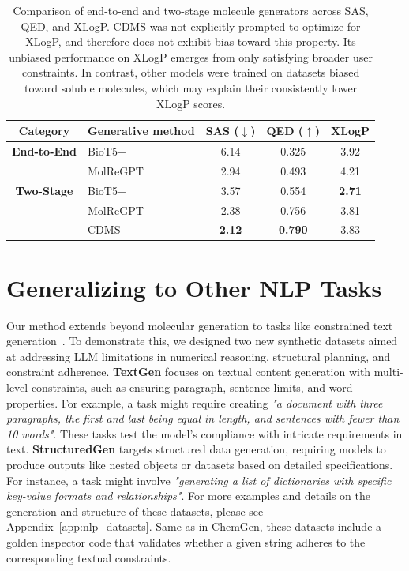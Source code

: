 \documentclass[10pt]{article} %
\begin{document}
\begin{table}
    \centering
    \small
    \begin{tabular}{c|l|c|c|c}
        \toprule
        Category & Generative method & SAS ($\downarrow$) & QED ($\uparrow$) & XLogP \\
        \midrule
        \textbf{End-to-End} & BioT5+     & 6.14 & 0.325 & 3.92 \\
                            & MolReGPT   & 2.94 & 0.493 & 4.21 \\
        \midrule
        \textbf{Two-Stage}  & BioT5+     & 3.57 & 0.554 & \textbf{2.71} \\
                            & MolReGPT   & 2.38 & 0.756 & 3.81  \\
                            & CDMS       & \textbf{2.12} & \textbf{0.790} & 3.83 \\
        \bottomrule
    \end{tabular}
    \caption{\small Comparison of end-to-end and two-stage molecule generators across SAS, QED, and XLogP. CDMS was not explicitly prompted to optimize for XLogP, and therefore does not exhibit bias toward this property. Its unbiased performance on XLogP emerges from only satisfying broader user constraints. In contrast, other models were trained on datasets biased toward soluble molecules, which may explain their consistently lower XLogP scores.}
    \label{tab:two_stage_vs_e2e}
\end{table}
    
\section{Generalizing to Other NLP Tasks}
    Our method extends beyond molecular generation to tasks like constrained text generation~\cite{lin-etal-2020-commongen}. To demonstrate this, we designed two new synthetic datasets aimed at addressing LLM limitations in numerical reasoning, structural planning, and constraint adherence.
    \textbf{TextGen} focuses on textual content generation with multi-level constraints, such as ensuring paragraph, sentence limits, and word properties. For example, a task might require creating \textit{"a document with three paragraphs, the first and last being equal in length, and sentences with fewer than 10 words"}. These tasks test the model’s compliance with intricate requirements in text.
    \textbf{StructuredGen} targets structured data generation, requiring models to produce outputs like nested objects or datasets based on detailed specifications. For instance, a task might involve \textit{"generating a list of dictionaries with specific key-value formats and relationships"}. For more examples and details on the generation and structure of these datasets, please see Appendix~\ref{app:nlp_datasets}. Same as in ChemGen, these datasets include a golden inspector code that validates whether a given string adheres to the corresponding textual constraints.
\end{document}
